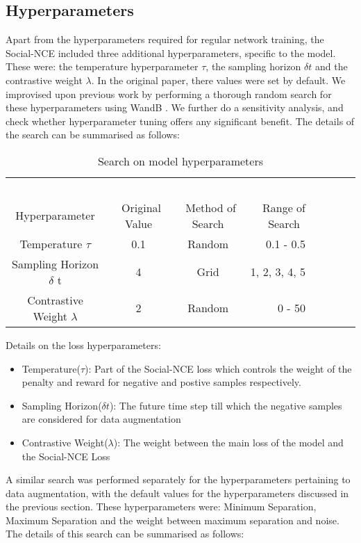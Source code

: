 \subsection{Hyperparameters}
Apart from the hyperparameters required for regular network training, the Social-NCE included three additional hyperparameters, specific to the model. These were: the temperature hyperparameter $\tau$, the sampling horizon $\delta t $ and the contrastive weight $\lambda$. In the original paper, there values were set by default. We improvised upon previous work by performing a thorough random search for these hyperparameters using WandB \cite{wandb}. We further do a sensitivity analysis, and check whether hyperparameter tuning offers any significant benefit. The details of the search can be summarised as follows:
\vspace{10pt}
\begin{table}[H]
\caption{Search on model hyperparameters}
\centering %
\begin{tabular}{ccc rrrrr} 
\hline 
&\ \ \ \ \ \\
Hyperparameter&\ Original Value&\ Method of Search&\ Range of Search\ \\ [0.5ex]
\hline 
Temperature $\tau$ &  0.1 & Random & 0.1 - 0.5\\
Sampling Horizon $\delta$ t & 4 & Grid & {1, 2, 3, 4, 5}\\
Contrastive Weight $\lambda$  &  2 & Random & 0 - 50\\
\hline %
\end{tabular}
\label{tab:hresult}
\end{table}
Details on the loss hyperparameters:
\begin{itemize}
    \item Temperature($\tau$): Part of the Social-NCE loss which controls the weight of the penalty and reward for negative and postive samples respectively.
    \item Sampling Horizon({$\delta t$}): The future time step till which the negative samples are considered for data augmentation
    \item Contrastive Weight($\lambda$): The weight between the main loss of the model and the Social-NCE Loss
\end{itemize}
A similar search was performed separately for the hyperparameters pertaining to data augmentation, with the default values for the hyperparameters discussed in the previous section. These hyperparameters were: Minimum Separation, Maximum Separation and the weight between maximum separation and noise. The details of this search can be summarised as follows:
